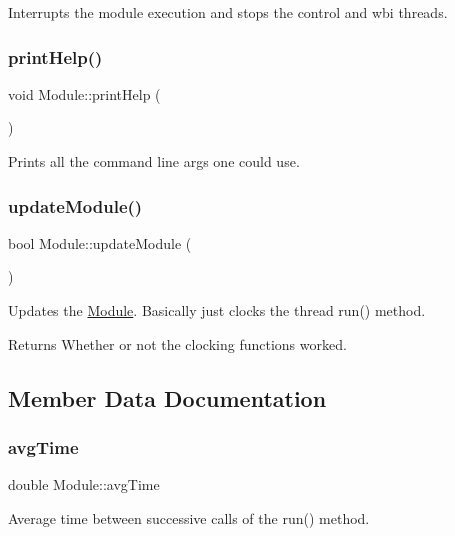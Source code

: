 Interrupts the module execution and stops the control and wbi threads. \hypertarget{classModule_a861f70d79b8f36dccf5daae182763bd8}{}\label{classModule_a861f70d79b8f36dccf5daae182763bd8} 
\subsubsection{\texorpdfstring{print\+Help()}{printHelp()}}
{\footnotesize\ttfamily void Module\+::print\+Help (\begin{DoxyParamCaption}{ }\end{DoxyParamCaption})}

Prints all the command line args one could use. \hypertarget{classModule_a1b1c4963512941537cef766217329a8a}{}\label{classModule_a1b1c4963512941537cef766217329a8a} 
\subsubsection{\texorpdfstring{update\+Module()}{updateModule()}}
{\footnotesize\ttfamily bool Module\+::update\+Module (\begin{DoxyParamCaption}{ }\end{DoxyParamCaption})}

Updates the \hyperlink{classModule}{Module}. Basically just clocks the thread run() method. \begin{DoxyReturn}{Returns}
Whether or not the clocking functions worked. 
\end{DoxyReturn}


\subsection{Member Data Documentation}
\hypertarget{classModule_a1a20dbf0d18e5020ad85d38a0ba22b88}{}\label{classModule_a1a20dbf0d18e5020ad85d38a0ba22b88} 
\subsubsection{\texorpdfstring{avg\+Time}{avgTime}}
{\footnotesize\ttfamily double Module\+::avg\+Time\hspace{0.3cm}{\ttfamily [private]}}

Average time between successive calls of the {\ttfamily run()} method. \hypertarget{classModule_a5baf8260eb8a45ebbb75474f2b277edc}{}\label{classModule_a5baf8260eb8a45ebbb75474f2b277edc} 
